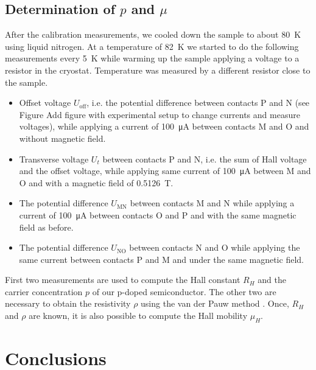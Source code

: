 \documentclass[11pt,a4paper]{article}
\begin{document}
\subsection{Determination of $p$ and $\mu$}

After the calibration measurements, we cooled down the sample to about \SI{80}{\kelvin} using liquid nitrogen. At a temperature of \SI{82}{\kelvin} we started to do the following measurements every \SI{5}{\kelvin} while warming up the sample applying a voltage to a resistor in the cryostat. Temperature was measured by a different resistor close to the sample.
\begin{itemize}
\item Offset voltage $U_\text{off}$, i.e. the potential difference between contacts P and N (see Figure {\color{red}Add figure with experimental setup to change currents and measure voltages}), while applying a current of \SI{100}{\micro\ampere} between contacts M and O and without magnetic field.
\item Transverse voltage $U_t$ between contacts P and N, i.e. the sum of Hall voltage and the offset voltage, while applying same current of \SI{100}{\micro\ampere} between M and O and with a magnetic field of \SI{0.5126}{\tesla}.
\item The potential difference $U_\text{MN}$ between contacts M and N while applying a current of \SI{100}{\micro\ampere} between contacts O and P and with the same magnetic field as before.
\item The potential difference $U_\text{NO}$ between contacts N and O while applying the same current between contacts P and M and under the same magnetic field.
\end{itemize}

First two measurements are used to compute the Hall constant $R_H$ and the carrier concentration $p$ of our p-doped semiconductor. The other two are necessary to obtain the resistivity $\rho$ using the van der Pauw method \cite{vdP}. Once, $R_H$ and $\rho$ are known, it is also possible to compute the Hall mobility $\mu_H$.

\section{Conclusions}

\nocite{*}
\vfill


\end{document}
